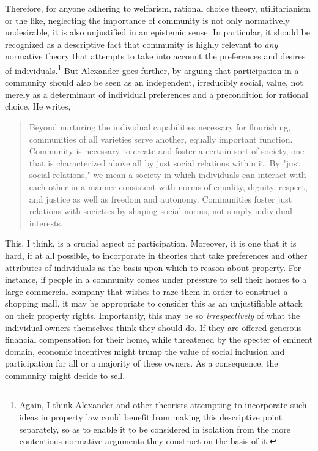 Therefore, for anyone adhering to welfarism, rational choice theory, utilitarianism or the like, neglecting the importance of community is not only normatively undesirable, it is also unjustified in an epistemic sense. In particular, it should be recognized as a descriptive fact that community is highly relevant to {\it any} normative theory that attempts to take into account the preferences and desires of individuals.\footnote{Again, I think Alexander and other theorists attempting to incorporate such ideas in property law could benefit from making this descriptive point separately, so as to enable it to be considered in isolation from the more contentious normative arguments they construct on the basis of it.}
But Alexander goes further, by arguing that participation in a community should also be seen as an independent, irreducibly social, value, not merely as a determinant of individual preferences and a precondition for rational choice. He writes,

\begin{quote}
Beyond nurturing the individual capabilities necessary for flourishing, communities of all varieties serve another, equally important function. Community is necessary to create and foster a certain sort of society, one that is characterized above all by just social relations within it. By "just social relations," we mean a society in which individuals can interact with each other in a manner consistent with norms of equality, dignity, respect, and justice as well as freedom and autonomy. Communities foster just relations with societies by shaping social norms, not simply individual interests.
\end{quote}

This, I think, is a crucial aspect of participation. Moreover, it is one that it is hard, if at all possible, to incorporate in theories that take  preferences and other attributes of individuals as the basis upon which to reason about property. For instance, if people in a community comes under pressure to sell their homes to a large commercial company that wishes to raze them in order to construct a shopping mall, it may be appropriate to consider this as an unjustifiable attack on their property rights. Importantly, this may be so {\it irrespectively} of what the individual owners themselves think they should do. If they are offered generous financial compensation for their home, while threatened by the specter of eminent domain, economic incentives might trump the value of social inclusion and participation for all or a majority of these owners. As a consequence, the community might decide to sell.  

